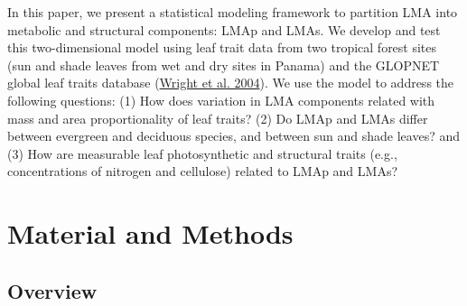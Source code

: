 \documentclass[
  12pt,
]{article}
\begin{document}
In this paper, we present a statistical modeling framework to partition LMA into metabolic and structural components: LMAp and LMAs.
We develop and test this two-dimensional model using leaf trait data from two tropical forest sites (sun and shade leaves from wet and dry sites in Panama) and the GLOPNET global leaf traits database (\protect\hyperlink{ref-Wright2004a}{Wright et al. 2004}).
We use the model to address the following questions: (1) How does variation in LMA components related with mass and area proportionality of leaf traits? (2) Do LMAp and LMAs differ between evergreen and deciduous species, and between sun and shade leaves? and (3) How are measurable leaf photosynthetic and structural traits (e.g., concentrations of nitrogen and cellulose) related to LMAp and LMAs?

\hypertarget{material-and-methods}{%
\section{Material and Methods}\label{material-and-methods}}

\hypertarget{overview}{%
\subsection{Overview}\label{overview}}
\end{document}
